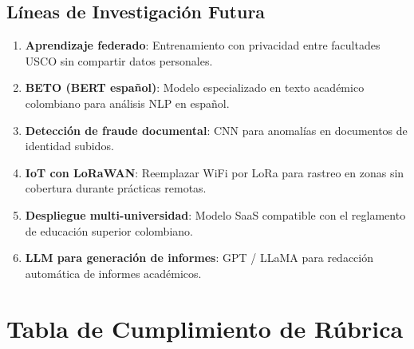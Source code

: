 \documentclass[12pt,a4paper,twoside]{report}
\begin{document}
\section{Líneas de Investigación Futura}
\begin{enumerate}[leftmargin=*]
\item \textbf{Aprendizaje federado}: Entrenamiento con privacidad entre facultades USCO sin compartir datos personales.
\item \textbf{BETO (BERT español)}: Modelo especializado en texto académico colombiano para análisis NLP en español.
\item \textbf{Detección de fraude documental}: CNN para anomalías en documentos de identidad subidos.
\item \textbf{IoT con LoRaWAN}: Reemplazar WiFi por LoRa para rastreo en zonas sin cobertura durante prácticas remotas.
\item \textbf{Despliegue multi-universidad}: Modelo SaaS compatible con el reglamento de educación superior colombiano.
\item \textbf{LLM para generación de informes}: GPT / LLaMA para redacción automática de informes académicos.
\end{enumerate}

\chapter*{Tabla de Cumplimiento de Rúbrica}
\end{document}
